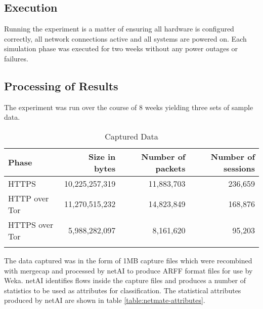 \subsection{Execution}

Running the experiment is a matter of ensuring all hardware is configured
correctly, all network connections active and all systems are powered on. Each
simulation phase was executed for two weeks without any power outages or
failures.

\subsection{Processing of Results}

The experiment was run over the course of 8 weeks yielding three sets of sample
data.

\begin{table}[H]
  \begin{tabular}{lrrr}
    \toprule
    Phase & Size in bytes & Number of packets & Number of sessions\\
    \midrule
    HTTPS & 10,225,257,319 & 11,883,703 & 236,659\\
    HTTP over Tor & 11,270,515,232 & 14,823,849 & 168,876\\
    HTTPS over Tor & 5,988,282,097 & 8,161,620 & 95,203\\
    \bottomrule
    \label{table:datasets}
  \end{tabular}
  \caption{Captured Data}
\end{table}

The data captured was in the form of 1MB capture files which were recombined
with mergecap and processed by netAI to produce ARFF format files for use by
Weka. netAI identifies flows inside the capture files and produces a number
of statistics to be used as attributes for classification. The statistical
attributes produced by netAI are shown in table \ref{table:netmate-attributes}.

